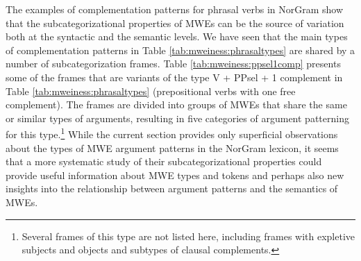 \documentclass[output=paper]{langsci/langscibook}
\begin{document}
The examples of complementation patterns for phrasal verbs in NorGram show that the subcategorizational properties of MWEs can be the source of variation both at the syntactic and the semantic levels. 
We have seen that the main types of complementation patterns in Table \ref{tab:mweiness:phrasaltypes} are shared by a number of subcategorization frames. %
Table \ref{tab:mweiness:ppsel1comp} presents some of the frames that are variants of the type V + PPsel + 1 complement in Table \ref{tab:mweiness:phrasaltypes} (prepositional verbs with one free complement). 
The frames are divided into groups of MWEs that share the same or similar types of arguments, resulting in five categories of argument patterning for this type.\footnote{Several frames of this type are not listed here, including frames with expletive subjects and objects and subtypes of clausal complements.} 
While the current section provides only superficial observations about the types of MWE argument patterns in the NorGram lexicon, it seems that a more systematic study of their subcategorizational properties could provide useful information about MWE types and tokens and perhaps also new insights into the relationship between argument patterns and the semantics of MWEs.
 
\end{document}
